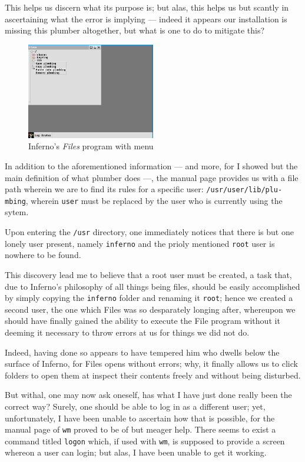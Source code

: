 \documentclass[a5paper,twoside,12pt]{report}
\begin{document}
  This helps us discern what its purpose is; but alas, this helps us but scantly in ascertaining what the error is implying — indeed it appears our installation is missing this plumber altogether, but what is one to do to mitigate this?

  \begin{figure}
    \centering
    \includegraphics[width=0.5\textwidth]{imgs/files-menu.png}
    \caption{Inferno's \textit{Files} program with menu}
  \end{figure}

  In addition to the aforementioned information — and more, for I showed but the main definition of what plumber does —, the manual page provides us with a file path wherein we are to find its rules for a specific user: \texttt{/usr/user/lib/plu-\\mbing}, wherein \texttt{user} must be replaced by the user who is currently using the sytem.

  Upon entering the \texttt{/usr} directory, one immediately notices that there is but one lonely user present, namely \texttt{inferno} and the prioly mentioned \texttt{root} user is nowhere to be found.

  This discovery lead me to believe that a root user must be created, a task that, due to Inferno's philosophy of all things being files, should be easily accomplished by simply copying the \texttt{inferno} folder and renaming it \texttt{root}; hence we created a second user, the one which Files was so desparately longing after, whereupon we should have finally gained the ability to execute the File program without it deeming it necessary to throw errors at us for things we did not do.

  Indeed, having done so appears to have tempered him who dwells below the surface of Inferno, for Files opens without errors; why, it finally allows us to click folders to open them at inspect their contents freely and without being disturbed.

  But withal, one may now ask oneself, has what I have just done really been the correct way? Surely, one should be able to log in as a different user; yet, unfortunately, I have been unable to ascertain how that is possible, for the manual page of \texttt{wm} proved to be of but meager help. There seems to exist a command titled \texttt{logon} which, if used with \texttt{wm}, is supposed to provide a screen whereon a user can login; but alas, I have been unable to get it working.
\end{document}
